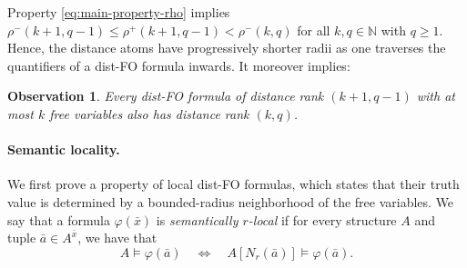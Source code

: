\documentclass[11pt]{article}
\newtheorem{observation}[theorem]{Observation}
\theoremstyle{remark}
\def\phi{\varphi}
\def\N{\mathbb N}
\renewcommand{\le}{\leqslant}
\renewcommand{\ge}{\geqslant}
\newcommand{\distFO}{\textrm{\upshape dist-FO}\xspace}
\begin{document}
\medskip

Property \eqref{eq:main-property-rho} implies \(\rho^-(k+1,q-1)\le \rho^+(k+1,q-1) < \rho^-(k,q)\) for all \(k,q \in \N\) with $q\ge 1$. Hence, the distance atoms have progressively shorter radii as one traverses the quantifiers of a \distFO formula inwards. It moreover implies:

\begin{observation}\label{obs:preservedistrank}
    Every \distFO formula of distance rank \((k+1,q-1)\) with at most \(k\) free variables also has distance rank \((k,q)\).
\end{observation}

\paragraph{Semantic locality.}
We first prove a property of local \distFO formulas, which states that their truth value is determined by a bounded-radius neighborhood of the free variables. We say that a formula $\phi(\bar x)$ is \emph{semantically $r$-local}
if for every structure $A$ and tuple $\bar a\in A^{\bar x}$,
we have that
$$A\models \phi(\bar a) \quad\Longleftrightarrow\quad A[N_r(\bar a)]\models \phi(\bar a).$$
\end{document}
